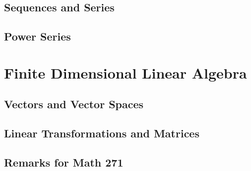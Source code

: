\documentclass[12pt,letterpaper, openany]{book} %
\begin{document}
\chapter{Sequences and Series}


\chapter{Power Series}


\part{Finite Dimensional Linear Algebra}
\chapter{Vectors and Vector Spaces}


\chapter{Linear Transformations and Matrices}


\chapter*{Remarks for Math 271}



 
\newenvironment{changemargin}[1]{%
\begin{list}{}{%
\setlength{\topsep}{#1}
\setlength{\listparindent}{\parindent}%
\setlength{\itemindent}{\parindent}%
\setlength{\parsep}{\parskip}%
}%
\item[]}{\end{list}}

\begin{changemargin}{3cm}
\printindex 
\end{changemargin}

 
\end{document}
